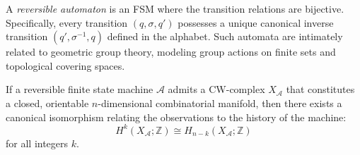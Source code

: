A \emph{reversible automaton} is an FSM where the transition relations are bijective. Specifically, every transition $(q, \sigma, q')$ possesses a unique canonical inverse transition $(q', \sigma^{-1}, q)$ defined in the alphabet. Such automata are intimately related to geometric group theory, modeling group actions on finite sets and topological covering spaces.

\begin{theorem}
If a reversible finite state machine $\mathcal{A}$ admits a CW-complex $X_\mathcal{A}$ that constitutes a closed, orientable $n$-dimensional combinatorial manifold, then there exists a canonical isomorphism relating the observations to the history of the machine:
\[ H^k(X_\mathcal{A}; \mathbb{Z}) \cong H_{n-k}(X_\mathcal{A}; \mathbb{Z}) \]
for all integers $k$.
\end{theorem}
